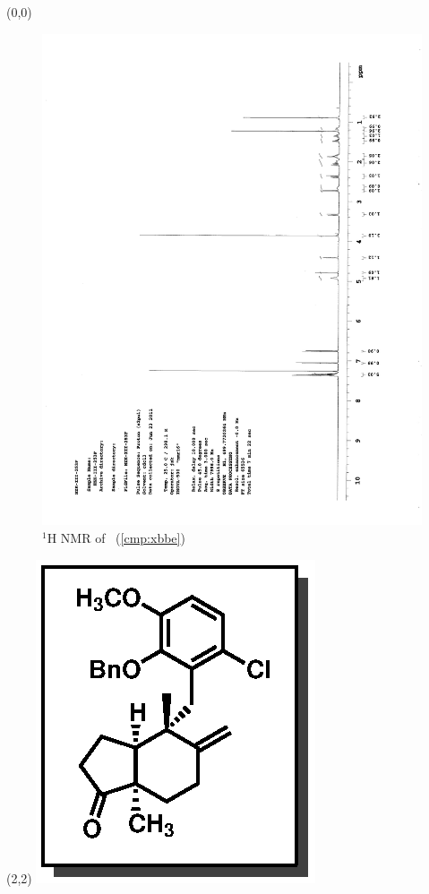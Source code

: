 \begin{textblock}{20}(0,0)
\begin{figure}[htb]
\caption{$^1$H NMR of \CMPxbbe\ (\ref{cmp:xbbe})}
\includegraphics[scale=0.75, trim = 0mm 0mm 0mm 5mm,
clip]{chp_singlecarbon/images/nmr/xbbeH}
\vspace{-100pt}
\end{figure}
\end{textblock}
\begin{textblock}{1}(2,2)
\includegraphics[scale=0.8, angle=90]{chp_singlecarbon/images/xbbe}
\end{textblock}
